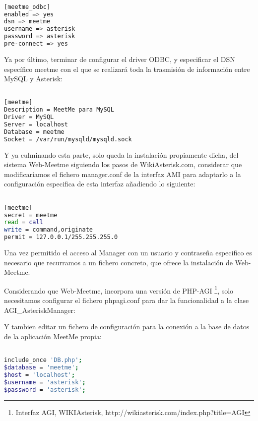 \begin{lstlisting}[language=bash,title={/etc/asterisk/res\_odbc.conf}]

[meetme_odbc]
enabled => yes
dsn => meetme
username => asterisk
password => asterisk
pre-connect => yes

\end{lstlisting}

Ya por último, terminar de configurar el driver ODBC, y especificar el DSN específico meetme con el que se realizará toda la trasmisión de información entre MySQL y Asterisk:

\begin{lstlisting}[language=bash,title={/etc/odbc.ini}]

[meetme]
Description = MeetMe para MySQL
Driver = MySQL
Server = localhost
Database = meetme
Socket = /var/run/mysqld/mysqld.sock

\end{lstlisting}

Y ya culminando esta parte, solo queda la instalación propiamente dicha, del sistema Web-Meetme siguiendo los pasos de WikiAsterisk.com, considerar que modificaríamos el fichero manager.conf de la interfaz AMI para adaptarlo a la configuración especifica de esta interfaz añadiendo lo siguiente:

\begin{lstlisting}[language=bash,title={/etc/asterisk/manager.conf}]

[meetme]
secret = meetme 
read = call
write = command,originate
permit = 127.0.0.1/255.255.255.0

\end{lstlisting}

Una vez permitido el acceso al Manager con un usuario y contraseña especifico es necesario que recurramos a un fichero concreto, que ofrece la instalación de Web-Meetme. 

Considerando que Web-Meetme, incorpora una versión de PHP-AGI \footnote{Interfaz AGI, WIKIAsterisk, http://wikiasterisk.com/index.php?title=AGI}, solo necesitamos configurar el fichero phpagi.conf para dar la funcionalidad a la clase AGI\_AsteriskManager:



Y tambien editar un fichero de configuración para la conexión a la base de datos de la aplicación MeetMe propia:

\begin{lstlisting}[language=bash,title={/var/www/web-meetme/lib/database.php}]

include_once 'DB.php';
$database = 'meetme';
$host = 'localhost';
$username = 'asterisk';
$password = 'asterisk';

\end{lstlisting}

